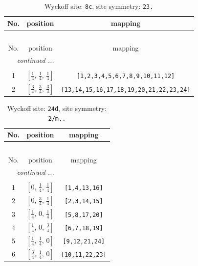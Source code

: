 \documentclass[fleqn,8pt]{jsarticle}
\begin{document}
\renewcommand{\arraystretch}{1.2}
\begin{longtable}{ccc}
\caption{Wyckoff site: {\tt 8c}, site symmetry: {\tt 23.}}
 \\
 \hline \hline
No. & position & mapping \\ \hline \endfirsthead

\multicolumn{2}{l}{\tablename\ \thetable{}} \\
 \hline \hline
No. & position & mapping \\ \hline \endhead

 \hline \hline
\multicolumn{2}{r}{\footnotesize\it continued ...} \\ \endfoot

 \hline \hline
\multicolumn{2}{r}{} \\ \endlastfoot

1 & $\left[ \frac{1}{4},\, \frac{1}{4},\, \frac{1}{4} \right]$ & {\tt [1,2,3,4,5,6,7,8,9,10,11,12]} \\ \hline
2 & $\left[ \frac{3}{4},\, \frac{3}{4},\, \frac{3}{4} \right]$ & {\tt [13,14,15,16,17,18,19,20,21,22,23,24]} \\
\end{longtable}
\renewcommand{\arraystretch}{1.2}
\begin{longtable}{ccc}
\caption{Wyckoff site: {\tt 24d}, site symmetry: {\tt 2/m..}}
 \\
 \hline \hline
No. & position & mapping \\ \hline \endfirsthead

\multicolumn{2}{l}{\tablename\ \thetable{}} \\
 \hline \hline
No. & position & mapping \\ \hline \endhead

 \hline \hline
\multicolumn{2}{r}{\footnotesize\it continued ...} \\ \endfoot

 \hline \hline
\multicolumn{2}{r}{} \\ \endlastfoot

1 & $\left[ 0,\, \frac{1}{4},\, \frac{1}{4} \right]$ & {\tt [1,4,13,16]} \\ \hline
2 & $\left[ 0,\, \frac{3}{4},\, \frac{1}{4} \right]$ & {\tt [2,3,14,15]} \\ \hline
3 & $\left[ \frac{1}{4},\, 0,\, \frac{1}{4} \right]$ & {\tt [5,8,17,20]} \\ \hline
4 & $\left[ \frac{1}{4},\, 0,\, \frac{3}{4} \right]$ & {\tt [6,7,18,19]} \\ \hline
5 & $\left[ \frac{1}{4},\, \frac{1}{4},\, 0 \right]$ & {\tt [9,12,21,24]} \\ \hline
6 & $\left[ \frac{3}{4},\, \frac{1}{4},\, 0 \right]$ & {\tt [10,11,22,23]} \\
\end{longtable}
\end{document}
